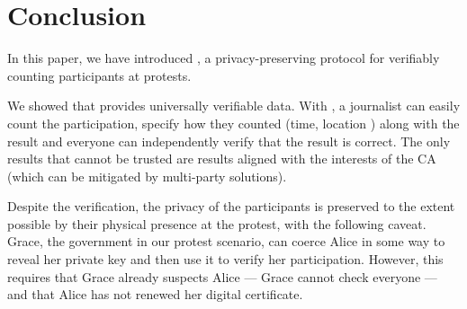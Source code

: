 \section{Conclusion}%
\label{Conclusion}

In this paper, we have introduced \CROCUS, a privacy-preserving protocol for verifiably counting participants at protests. 

We showed that \CROCUS provides universally verifiable data.
With \CROCUS, a journalist can easily count the participation, specify how they 
counted (time, location \etc) along with the result and everyone can 
independently verify that the result is correct.
The only results that cannot be trusted are results aligned with the interests 
of the \ac{CA} (which can be mitigated by multi-party solutions).

Despite the verification, the privacy of the participants is preserved to the extent possible by their physical presence at the protest, with the following caveat. Grace, the government in our protest scenario, can coerce Alice in some way to reveal her private key and then use it to verify her participation. However, this requires that Grace already suspects Alice --- Grace cannot check everyone --- and that Alice has not renewed her digital certificate.







